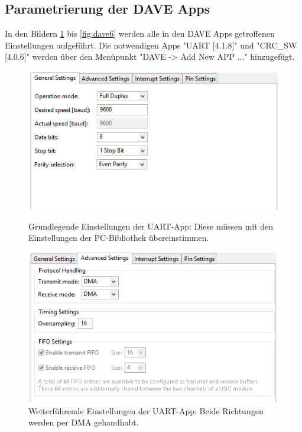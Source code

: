 \subsection{Parametrierung der DAVE Apps}
In den Bildern \ref{fig:dave1} bis \ref{fig:dave6} werden alle in den DAVE Apps getroffenen Einstellungen aufgeführt. Die notwendigen Apps "UART [4.1.8]" und "CRC\_SW [4.0.6]" werden über den Menüpunkt "DAVE -> Add New APP ..." hinzugefügt.
\newpage
\begin{figure}[!h]
  \begin{minipage}{0.4\textwidth}
    \centering
    \includegraphics[width=\textwidth]{UARTgeneralSet}
    \caption{Grundlegende Einstellungen der UART-App: Diese müssen mit den Einstellungen der PC-Bibliothek übereinstimmen.}
    \label{fig:dave1}
  \end{minipage}
  \begin{minipage}{0.4\textwidth}
    \centering
    \includegraphics[width=\textwidth]{UARTadvancedSet}
    \caption{Weiterführende Einstellungen der UART-App: Beide Richtungen werden per DMA gehandhabt.}
  \end{minipage}

\end{figure}
